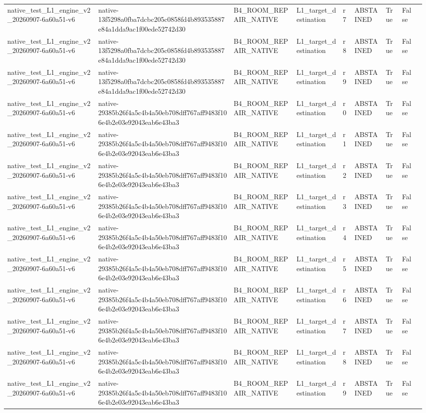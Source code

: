 \begin{tabular}{lllllllll}
native\_test\_L1\_engine\_v2\_20260907-6a60a51-v6 & native-13f5298a0fba7dcbc205c0858fd4b893535887e84a1dda9ac1f00ede52742d30 & B4\_ROOM\_REPAIR\_NATIVE & L1\_target\_destination & r7 & ABSTAINED & True & False &  \\
native\_test\_L1\_engine\_v2\_20260907-6a60a51-v6 & native-13f5298a0fba7dcbc205c0858fd4b893535887e84a1dda9ac1f00ede52742d30 & B4\_ROOM\_REPAIR\_NATIVE & L1\_target\_destination & r8 & ABSTAINED & True & False &  \\
native\_test\_L1\_engine\_v2\_20260907-6a60a51-v6 & native-13f5298a0fba7dcbc205c0858fd4b893535887e84a1dda9ac1f00ede52742d30 & B4\_ROOM\_REPAIR\_NATIVE & L1\_target\_destination & r9 & ABSTAINED & True & False &  \\
native\_test\_L1\_engine\_v2\_20260907-6a60a51-v6 & native-29385b26f4a5c4b4a50eb708dff767aff9483f106e4b2e03e92043eab6e43ba3 & B4\_ROOM\_REPAIR\_NATIVE & L1\_target\_destination & r0 & ABSTAINED & True & False &  \\
native\_test\_L1\_engine\_v2\_20260907-6a60a51-v6 & native-29385b26f4a5c4b4a50eb708dff767aff9483f106e4b2e03e92043eab6e43ba3 & B4\_ROOM\_REPAIR\_NATIVE & L1\_target\_destination & r1 & ABSTAINED & True & False &  \\
native\_test\_L1\_engine\_v2\_20260907-6a60a51-v6 & native-29385b26f4a5c4b4a50eb708dff767aff9483f106e4b2e03e92043eab6e43ba3 & B4\_ROOM\_REPAIR\_NATIVE & L1\_target\_destination & r2 & ABSTAINED & True & False &  \\
native\_test\_L1\_engine\_v2\_20260907-6a60a51-v6 & native-29385b26f4a5c4b4a50eb708dff767aff9483f106e4b2e03e92043eab6e43ba3 & B4\_ROOM\_REPAIR\_NATIVE & L1\_target\_destination & r3 & ABSTAINED & True & False &  \\
native\_test\_L1\_engine\_v2\_20260907-6a60a51-v6 & native-29385b26f4a5c4b4a50eb708dff767aff9483f106e4b2e03e92043eab6e43ba3 & B4\_ROOM\_REPAIR\_NATIVE & L1\_target\_destination & r4 & ABSTAINED & True & False &  \\
native\_test\_L1\_engine\_v2\_20260907-6a60a51-v6 & native-29385b26f4a5c4b4a50eb708dff767aff9483f106e4b2e03e92043eab6e43ba3 & B4\_ROOM\_REPAIR\_NATIVE & L1\_target\_destination & r5 & ABSTAINED & True & False &  \\
native\_test\_L1\_engine\_v2\_20260907-6a60a51-v6 & native-29385b26f4a5c4b4a50eb708dff767aff9483f106e4b2e03e92043eab6e43ba3 & B4\_ROOM\_REPAIR\_NATIVE & L1\_target\_destination & r6 & ABSTAINED & True & False &  \\
native\_test\_L1\_engine\_v2\_20260907-6a60a51-v6 & native-29385b26f4a5c4b4a50eb708dff767aff9483f106e4b2e03e92043eab6e43ba3 & B4\_ROOM\_REPAIR\_NATIVE & L1\_target\_destination & r7 & ABSTAINED & True & False &  \\
native\_test\_L1\_engine\_v2\_20260907-6a60a51-v6 & native-29385b26f4a5c4b4a50eb708dff767aff9483f106e4b2e03e92043eab6e43ba3 & B4\_ROOM\_REPAIR\_NATIVE & L1\_target\_destination & r8 & ABSTAINED & True & False &  \\
native\_test\_L1\_engine\_v2\_20260907-6a60a51-v6 & native-29385b26f4a5c4b4a50eb708dff767aff9483f106e4b2e03e92043eab6e43ba3 & B4\_ROOM\_REPAIR\_NATIVE & L1\_target\_destination & r9 & ABSTAINED & True & False &  \\
\end{tabular}
